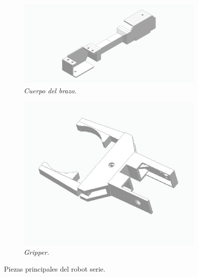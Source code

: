 \begin{figure}[H]
    \centering
    \begin{subfigure}{0.35\textwidth}
        \includegraphics[width=\textwidth]{img/brazo_medio.jpg} \par
    \caption{\textit{Cuerpo del brazo.}}
    \label{fig:brazo}
    \end{subfigure}
    \hspace{0.5cm}
    \begin{subfigure}{0.35\textwidth}
        \centering
\includegraphics[width=\textwidth]{img/pinza.jpg} \par
    \caption{\textit{Gripper.}}
    \label{fig:gripper}
    \end{subfigure}
    \caption{Piezas principales del robot serie.}
\end{figure}